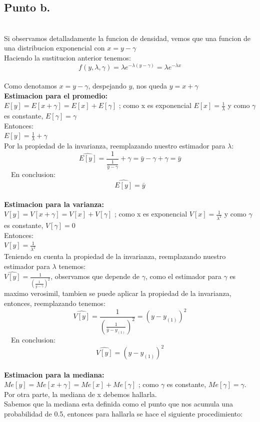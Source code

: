 \documentclass[letterpaper,12pt,onecolumn,titlepage]{article}
\begin{document}
\subsection{Punto b.} 
~\\ Si observamos detalladamente la funcion de densidad, vemos que una funcion de una distribucion exponencial con $x=y-\gamma$
~\\ Haciendo la sustitucion anterior tenemos:
$$f(y,\lambda,\gamma)=\lambda e^{-\lambda(y-\gamma)}=\lambda e^{-\lambda x}$$
~\\ Como denotamos $x=y-\gamma$, despejando $y$, nos queda $y=x+\gamma$
~\\ \textbf{Estimacion para el promedio:}
~\\ $E[y]=E[x+\gamma]=E[x]+E[\gamma]$ ; como x es exponencial $E[x]=\frac{1}{\lambda}$ y como $\gamma$ es constante, $E[\gamma]=\gamma$
~\\ Entonces:
~\\ $E[y]=\frac{1}{\lambda}+\gamma$
~\\ Por la propiedad de la invarianza, reemplazando nuestro estimador para $\lambda$:
$$\hat{E[y]}=\frac{1}{\frac{1}{\bar{y}-\gamma}}+\gamma=\bar{y}-\gamma+\gamma=\bar{y}$$
~\ En conclusion:
$$\hat{E[y]}=\bar{y}$$
~\\ \textbf{Estimacion para la varianza:}
~\\ $V[y]=V[x+\gamma]=V[x]+V[\gamma]$ ; como x es exponencial $V[x]=\frac{1}{\lambda^2}$ y como $\gamma$ es constante, $V[\gamma]=0$
~\\ Entonces:
~\\ $V[y]=\frac{1}{\lambda^2}$
~\\ Teniendo en cuenta la propiedad de la invarianza, reemplazando nuestro estimador para $\lambda$ tenemos:
~\\ $\hat{V[y]}=\frac{1}{(\frac{1}{\bar{y}-\gamma})^2}$, observamos que depende de $\gamma$, como el estimador para $\gamma$ es maximo verosimil, tambien se puede aplicar la propiedad de la invarianza, entonces, reemplazando tenemos:
~\\ $$\hat{V[y]}=\frac{1}{(\frac{1}{\bar{y}-y_{(1)}})^2}=(y-y_{(1)})^2$$
~\ En conclusion:
$$\hat{V[y]}=(y-y_{(1)})^2$$
~\\ \textbf{Estimacion para la mediana:}
~\\ $Me[y]=Me[x+\gamma]=Me[x]+Me[\gamma]$ ; como $\gamma$ es constante, $Me[\gamma]=\gamma$. Por otra parte, la mediana de x debemos hallarla.
~\\ Sabemos que la mediana esta definida como el punto que nos acumula una probabilidad de 0.5, entonces para hallarla se hace el siguiente procedimiento: 
\end{document}
